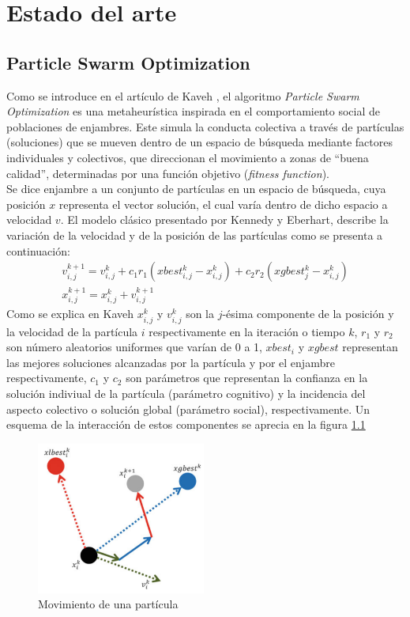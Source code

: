 
\chapter{Estado del arte}
\section{Particle Swarm Optimization}
Como se introduce en el artículo de Kaveh \cite{Psoexplain14}, el algoritmo \emph{Particle Swarm Optimization} es una metaheurística inspirada en el comportamiento social de poblaciones de enjambres. Este simula la conducta colectiva a través de partículas (soluciones) que se mueven dentro de un espacio de búsqueda mediante factores individuales y colectivos, que direccionan el movimiento a zonas de ``buena calidad'', determinadas por una función objetivo (\emph{fitness function}).\\
Se dice enjambre a un conjunto de partículas en un espacio de búsqueda, cuya posición $x$ representa el vector solución, el cual varía dentro de dicho espacio a velocidad $v$. El modelo clásico presentado por Kennedy y Eberhart\cite{Kennedy95}, describe la variación de la velocidad y de la posición de las partículas como se presenta a continuación:
\begin{align*}
    v_{i,j}^{k+1} = v_{i,j}^{k} + c_{1}r_{1}(xbest_{i,j}^k - x_{i,j}^k) + c_{2}r_{2}(xgbest_{j}^{k} - x_{i,j}^k)\\
    x_{i,j}^{k+1} = x_{i,j}^{k} + v_{i,j}^{k+1}
\end{align*}    
Como se explica en Kaveh \cite{Psoexplain14} $x_{i,j}^{k}$ y $v_{i,j}^{k}$ son la $j$-ésima componente de la posición y la velocidad de la partícula $i$ respectivamente en la iteración o tiempo $k$, $r_{1}$ y $r_{2}$ son número aleatorios uniformes que varían de 0 a 1, $xbest_i$ y $xgbest$ representan las mejores soluciones alcanzadas por la partícula y por el enjambre respectivamente, $c_1$ y $c_2$ son parámetros que representan la confianza en la solución indiviual de la partícula (parámetro cognitivo) y la incidencia del aspecto colectivo o solución global (parámetro social), respectivamente. Un esquema de la interacción de estos componentes se aprecia en la figura \ref{fig:move_part}\\
\begin{figure}[h!]
    \centering    
    \includegraphics[height=50mm]{figures/move_particle.png} 
    \caption{Movimiento de una partícula}
    \label{fig:move_part}
\end{figure}
